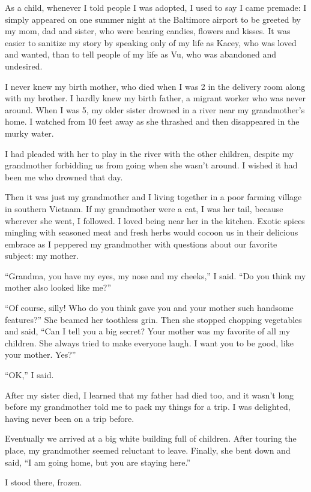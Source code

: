 As a child, whenever I told people I was adopted, I used to say I came
premade: I simply appeared on one summer night at the Baltimore airport
to be greeted by my mom, dad and sister, who were bearing candies,
flowers and kisses. It was easier to sanitize my story by speaking only
of my life as Kacey, who was loved and wanted, than to tell people of my
life as Vu, who was abandoned and undesired.

I never knew my birth mother, who died when I was 2 in the delivery room
along with my brother. I hardly knew my birth father, a migrant worker
who was never around. When I was 5, my older sister drowned in a river
near my grandmother's home. I watched from 10 feet away as she thrashed
and then disappeared in the murky water.

I had pleaded with her to play in the river with the other children,
despite my grandmother forbidding us from going when she wasn't around.
I wished it had been me who drowned that day.

Then it was just my grandmother and I living together in a poor farming
village in southern Vietnam. If my grandmother were a cat, I was her
tail, because wherever she went, I followed. I loved being near her in
the kitchen. Exotic spices mingling with seasoned meat and fresh herbs
would cocoon us in their delicious embrace as I peppered my grandmother
with questions about our favorite subject: my mother.

``Grandma, you have my eyes, my nose and my cheeks,'' I said. ``Do you
think my mother also looked like me?''

``Of course, silly! Who do you think gave you and your mother such
handsome features?'' She beamed her toothless grin. Then she stopped
chopping vegetables and said, ``Can I tell you a big secret? Your mother
was my favorite of all my children. She always tried to make everyone
laugh. I want you to be good, like your mother. Yes?''

``OK,'' I said.

After my sister died, I learned that my father had died too, and it
wasn't long before my grandmother told me to pack my things for a trip.
I was delighted, having never been on a trip before.

Eventually we arrived at a big white building full of children. After
touring the place, my grandmother seemed reluctant to leave. Finally,
she bent down and said, ``I am going home, but you are staying here.''

I stood there, frozen.

